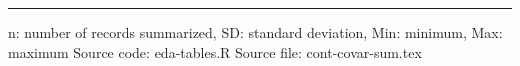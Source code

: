 \vskip 0.67cm
\begin{minipage}{1\linewidth}
\linespread{1.1}\selectfont
\rule{1\linewidth}{0.4pt}
\vskip 0.02cm
n: number of records summarized,
                 SD: standard deviation,
                 Min: minimum, Max: maximum \newline
Source code: eda-tables.R \newline
Source file: cont-covar-sum.tex \newline
\end{minipage}
